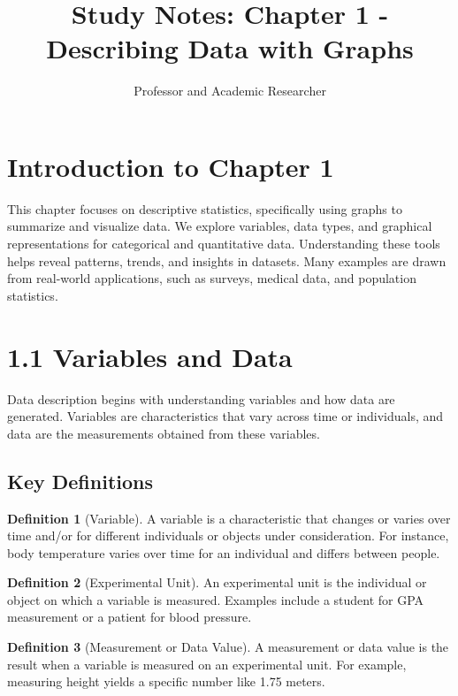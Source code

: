 \documentclass{article}
\title{Study Notes: Chapter 1 - Describing Data with Graphs}
\author{Professor and Academic Researcher}
\date{}
\theoremstyle{definition}
\newtheorem{definition}{Definition}
\begin{document}
	
	\maketitle
	
	\section{Introduction to Chapter 1}
	This chapter focuses on descriptive statistics, specifically using graphs to summarize and visualize data. We explore variables, data types, and graphical representations for categorical and quantitative data. Understanding these tools helps reveal patterns, trends, and insights in datasets. Many examples are drawn from real-world applications, such as surveys, medical data, and population statistics.
	
	\section{1.1 Variables and Data}
	Data description begins with understanding variables and how data are generated. Variables are characteristics that vary across time or individuals, and data are the measurements obtained from these variables.
	
	\subsection{Key Definitions}
	
	\begin{definition}[Variable]
		A variable is a characteristic that changes or varies over time and/or for different individuals or objects under consideration. For instance, body temperature varies over time for an individual and differs between people.
	\end{definition}
	
	\begin{definition}[Experimental Unit]
		An experimental unit is the individual or object on which a variable is measured. Examples include a student for GPA measurement or a patient for blood pressure.
	\end{definition}
	
	\begin{definition}[Measurement or Data Value]
		A measurement or data value is the result when a variable is measured on an experimental unit. For example, measuring height yields a specific number like 1.75 meters.
	\end{definition}
	
\end{document}
